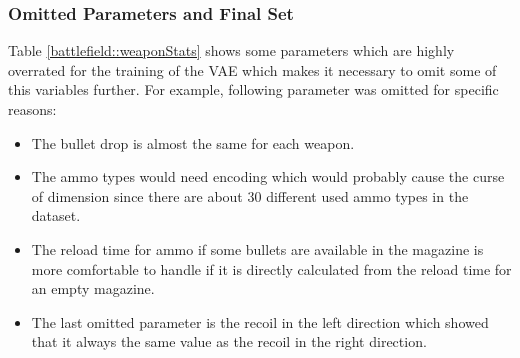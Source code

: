 \documentclass[MGS,Master,english]{twbook}%
\begin{document}
\subsubsection{Omitted Parameters and Final Set}
Table \ref{battlefield::weaponStats} shows some parameters which are highly overrated for the training of the VAE which makes it necessary to omit some of this variables further. For example, following parameter was omitted for specific reasons:
\begin{itemize}
	\item The bullet drop is almost the same for each weapon.
	\item The ammo types would need encoding which would probably cause the curse of dimension since there are about 30 different used ammo types in the dataset.
	\item The reload time for ammo if some bullets are available in the magazine is more comfortable to handle if it is directly calculated from the reload time for an empty magazine.
	\item The last omitted parameter is the recoil in the left direction which showed that it always the same value as the recoil in the right direction.
\end{itemize}
\end{document}
